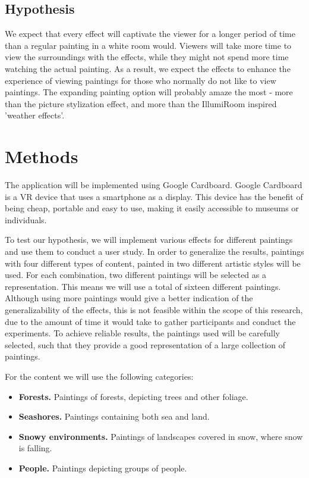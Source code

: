 \documentclass[a4paper]{article}
\begin{document}
\subsection {Hypothesis}
We expect that every effect will captivate the viewer for a longer period of time than a regular painting in a white room would. Viewers will take more time to view the surroundings with the effects, while they might not spend more time watching the actual painting. As a result, we expect the effects to enhance the experience of viewing paintings for those who normally do not like to view paintings. The expanding painting option will probably amaze the most - more than the picture stylization effect, and more than the IllumiRoom inspired 'weather effects'.

\section{Methods} \label{sec:methods}

The application will be implemented using Google Cardboard. Google Cardboard is a VR device that uses a smartphone as a display. This device has the benefit of being cheap, portable and easy to use, making it easily accessible to museums or individuals.

To test our hypothesis, we will implement various effects for different paintings and use them to conduct a user study. In order to generalize the results, paintings with four different types of content, painted in two different artistic styles will be used. For each combination, two different paintings will be selected as a representation. This means we will use a total of sixteen different paintings. Although using more paintings would give a better indication of the generalizability of the effects, this is not feasible within the scope of this research, due to the amount of time it would take to gather participants and conduct the experiments. To achieve reliable results, the paintings used will be carefully selected, such that they provide a good representation of a large collection of paintings.

For the content we will use the following categories:

\begin{itemize}
\item \textbf{Forests.} Paintings of forests, depicting trees and other foliage.
\item \textbf{Seashores.} Paintings containing both sea and land.
\item \textbf{Snowy environments.} Paintings of landscapes covered in snow, where snow is falling.
\item \textbf{People.} Paintings depicting groups of people.
\end{itemize}
\end{document}
